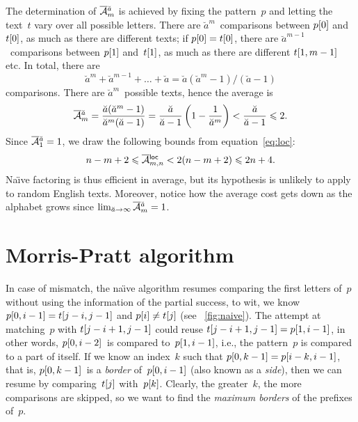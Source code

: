 The determination of \(\OM{\breve{a}}{m}\) is achieved by fixing the
pattern~\(p\) and letting the text~\(t\) vary over all possible
letters. There are \(\breve{a}^{m}\)~comparisons between
\({p}[{0}]\) and~\({t}[{0}]\), as much as there are different
texts; if \({p}[{0}]={t}[{0}]\), there are
\(\breve{a}^{m-1}\)~comparisons between \({p}[{1}]\)
and~\({t}[{1}]\), as much as there are different \({t}[{1,m-1}]\)
etc. In total, there are
\begin{equation*}
\breve{a}^{m} + \breve{a}^{m-1} + \dots +
\breve{a} = \breve{a}(\breve{a}^{m} - 1)/(\breve{a}-1)
\end{equation*}
comparisons. There are \(\breve{a}^m\)~possible texts, hence the
average is
\begin{equation*}
\OM{\breve{a}}{m}
 = \frac{\breve{a}(\breve{a}^{m}-1)}{\breve{a}^m(\breve{a}-1)}
 = \frac{\breve{a}}{\breve{a}-1}\left(1
                          - \frac{1}{\breve{a}^{m}}\right)
 < \frac{\breve{a}}{\breve{a}-1}
 \leqslant 2.
\end{equation*}
Since \(\OM{\breve{a}}{1} = 1\), we draw the following bounds from
equation~\eqref{eq:loc}:
\begin{equation*}
n - m + 2 \leqslant \OM{\fun{loc}}{m,n} < 2(n-m+2) \leqslant 2n + 4.
\end{equation*}
Na\"{\i}ve factoring is thus efficient in average, but its hypothesis
is unlikely to apply to random English texts. Moreover, notice how the
average cost gets down as the alphabet grows since \(\lim_{\breve{a}
  \to \infty}\OM{\breve{a}}{m} = 1\). 


\section{Morris-Pratt algorithm}

In case of mismatch, the na\"{\i}ve algorithm resumes comparing the
first letters of~\(p\) without using the information of the partial
success, to wit, we know \({p}[{0,i-1}] = {t}[{j-i,j-1}]\) and
\({p}[{i}] \neq {t}[{j}]\) (see \fig~\vref{fig:naive}).  The
attempt at matching~\(p\) with \({t}[{j-i+1,j-1}]\) could reuse
\({t}[{j-i+1,j-1}] = {p}[{1,i-1}]\), in other words,
\({p}[{0,i-2}]\)~is compared to~\({p}[{1,i-1}]\), i.e., the
pattern~\(p\) is compared to a part of itself. If we know an
index~\(k\) such that \({p}[{0,k-1}] = {p}[{i-k,i-1}]\), that is,
\({p}[{0,k-1}]\)~is a \emph{border} of~\({p}[{0,i-1}]\) (also
known as a \emph{side}), then
we can resume by comparing~\({t}[{j}]\)
with~\({p}[{k}]\). Clearly, the greater~\(k\), the more comparisons
are skipped, so we want to find the \emph{maximum borders} of the
prefixes of~\(p\).

